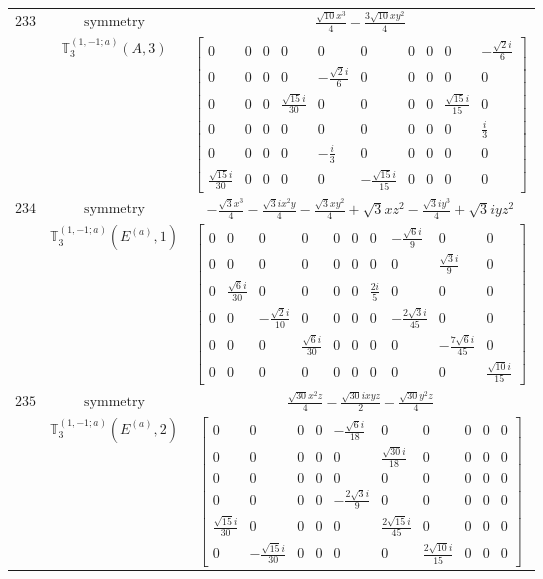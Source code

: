 \documentclass[fleqn,8pt,landscape]{jsarticle}
\begin{document}
\begin{longtable}{ccc}
$ 233 $ & $ \text{symmetry} $ & $ \frac{\sqrt{10} x^{3}}{4} - \frac{3 \sqrt{10} x y^{2}}{4} $ \\
$  $ & $ \mathbb{T}_{3}^{(1,-1;a)}(A,3) $ & $ \begin{bmatrix} 0 & 0 & 0 & 0 & 0 & 0 & 0 & 0 & 0 & - \frac{\sqrt{2} i}{6} \\ 0 & 0 & 0 & 0 & - \frac{\sqrt{2} i}{6} & 0 & 0 & 0 & 0 & 0 \\ 0 & 0 & 0 & \frac{\sqrt{15} i}{30} & 0 & 0 & 0 & 0 & \frac{\sqrt{15} i}{15} & 0 \\ 0 & 0 & 0 & 0 & 0 & 0 & 0 & 0 & 0 & \frac{i}{3} \\ 0 & 0 & 0 & 0 & - \frac{i}{3} & 0 & 0 & 0 & 0 & 0 \\ \frac{\sqrt{15} i}{30} & 0 & 0 & 0 & 0 & - \frac{\sqrt{15} i}{15} & 0 & 0 & 0 & 0 \end{bmatrix} $ \\ \hline
$ 234 $ & $ \text{symmetry} $ & $ - \frac{\sqrt{3} x^{3}}{4} - \frac{\sqrt{3} i x^{2} y}{4} - \frac{\sqrt{3} x y^{2}}{4} + \sqrt{3} x z^{2} - \frac{\sqrt{3} i y^{3}}{4} + \sqrt{3} i y z^{2} $ \\
$  $ & $ \mathbb{T}_{3}^{(1,-1;a)}(E^{(a)},1) $ & $ \begin{bmatrix} 0 & 0 & 0 & 0 & 0 & 0 & 0 & - \frac{\sqrt{6} i}{9} & 0 & 0 \\ 0 & 0 & 0 & 0 & 0 & 0 & 0 & 0 & \frac{\sqrt{3} i}{9} & 0 \\ 0 & \frac{\sqrt{6} i}{30} & 0 & 0 & 0 & 0 & \frac{2 i}{5} & 0 & 0 & 0 \\ 0 & 0 & - \frac{\sqrt{2} i}{10} & 0 & 0 & 0 & 0 & - \frac{2 \sqrt{3} i}{45} & 0 & 0 \\ 0 & 0 & 0 & \frac{\sqrt{6} i}{30} & 0 & 0 & 0 & 0 & - \frac{7 \sqrt{6} i}{45} & 0 \\ 0 & 0 & 0 & 0 & 0 & 0 & 0 & 0 & 0 & \frac{\sqrt{10} i}{15} \end{bmatrix} $ \\ \hline
$ 235 $ & $ \text{symmetry} $ & $ \frac{\sqrt{30} x^{2} z}{4} - \frac{\sqrt{30} i x y z}{2} - \frac{\sqrt{30} y^{2} z}{4} $ \\
$  $ & $ \mathbb{T}_{3}^{(1,-1;a)}(E^{(a)},2) $ & $ \begin{bmatrix} 0 & 0 & 0 & 0 & - \frac{\sqrt{6} i}{18} & 0 & 0 & 0 & 0 & 0 \\ 0 & 0 & 0 & 0 & 0 & \frac{\sqrt{30} i}{18} & 0 & 0 & 0 & 0 \\ 0 & 0 & 0 & 0 & 0 & 0 & 0 & 0 & 0 & 0 \\ 0 & 0 & 0 & 0 & - \frac{2 \sqrt{3} i}{9} & 0 & 0 & 0 & 0 & 0 \\ \frac{\sqrt{15} i}{30} & 0 & 0 & 0 & 0 & \frac{2 \sqrt{15} i}{45} & 0 & 0 & 0 & 0 \\ 0 & - \frac{\sqrt{15} i}{30} & 0 & 0 & 0 & 0 & \frac{2 \sqrt{10} i}{15} & 0 & 0 & 0 \end{bmatrix} $ \\ \hline

\end{longtable}
\end{document}
